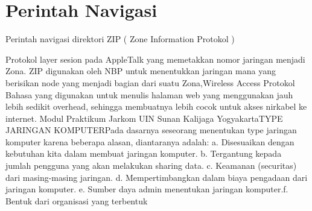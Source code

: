 \section{Perintah Navigasi}
Perintah navigasi direktori
ZIP ( Zone Information Protokol )

Protokol layer sesion pada AppleTalk yang memetakkan nomor jaringan menjadi Zona. ZIP digunakan oleh NBP untuk menentukkan jaringan mana yang berisikan node yang menjadi bagian dari suatu Zona,Wireless Access Protokol Bahasa yang digunakan untuk menulis halaman web yang menggunakan jauh lebih sedikit overhead, sehingga membuatnya lebih cocok untuk akses nirkabel ke internet.
Modul Praktikum Jarkom UIN Sunan Kalijaga YogyakartaTYPE JARINGAN KOMPUTERPada   dasarnya   seseorang   menentukan   type   jaringan   komputer   karena beberapa alasan, diantaranya adalah:
a. Disesuaikan dengan kebutuhan kita dalam membuat jaringan komputer.
b. Tergantung kepada jumlah pengguna yang akan melakukan sharing data.
c. Keamanan (securitas) dari masing-masing jaringan.
d. Mempertimbangkan dalam biaya pengadaan dari jaringan komputer.
e. Sumber daya admin menentukan jaringan komputer.f. Bentuk dari organisasi yang terbentuk 